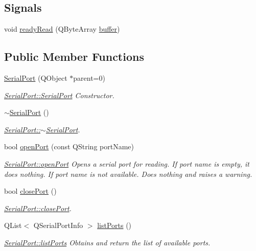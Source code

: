 \subsection*{Signals}
\begin{DoxyCompactItemize}
\item 
void \hyperlink{class_serial_port_a3ec0fe7fd001c56fb95e010da11817c0}{ready\-Read} (Q\-Byte\-Array \hyperlink{class_serial_port_af5ff5c504f070840bd28ee371f353f05}{buffer})
\end{DoxyCompactItemize}
\subsection*{Public Member Functions}
\begin{DoxyCompactItemize}
\item 
\hyperlink{class_serial_port_ae68e4a28e607b4acbab2c2a894cb3e2b}{Serial\-Port} (Q\-Object $\ast$parent=0)
\begin{DoxyCompactList}\small\item\em \hyperlink{class_serial_port_ae68e4a28e607b4acbab2c2a894cb3e2b}{Serial\-Port\-::\-Serial\-Port} Constructor. \end{DoxyCompactList}\item 
\hyperlink{class_serial_port_a8e09f366ed9b26b0456b66ae7bd8c702}{$\sim$\-Serial\-Port} ()
\begin{DoxyCompactList}\small\item\em \hyperlink{class_serial_port_a8e09f366ed9b26b0456b66ae7bd8c702}{Serial\-Port\-::$\sim$\-Serial\-Port}. \end{DoxyCompactList}\item 
bool \hyperlink{class_serial_port_a746e1ff02d45d8bf6b94e8bcbde6bb0d}{open\-Port} (const Q\-String port\-Name)
\begin{DoxyCompactList}\small\item\em \hyperlink{class_serial_port_a746e1ff02d45d8bf6b94e8bcbde6bb0d}{Serial\-Port\-::open\-Port} Opens a serial port for reading. If port name is empty, it does nothing. If port name is not available. Does nothing and raises a warning. \end{DoxyCompactList}\item 
bool \hyperlink{class_serial_port_a71c52f501f57ab491d0dc83cbc5e6a14}{close\-Port} ()
\begin{DoxyCompactList}\small\item\em \hyperlink{class_serial_port_a71c52f501f57ab491d0dc83cbc5e6a14}{Serial\-Port\-::close\-Port}. \end{DoxyCompactList}\item 
Q\-List$<$ Q\-Serial\-Port\-Info $>$ \hyperlink{class_serial_port_acd94c96dd2608f90a9ead0ced2742d17}{list\-Ports} ()
\begin{DoxyCompactList}\small\item\em \hyperlink{class_serial_port_acd94c96dd2608f90a9ead0ced2742d17}{Serial\-Port\-::list\-Ports} Obtains and return the list of available ports. \end{DoxyCompactList}\end{DoxyCompactItemize}
